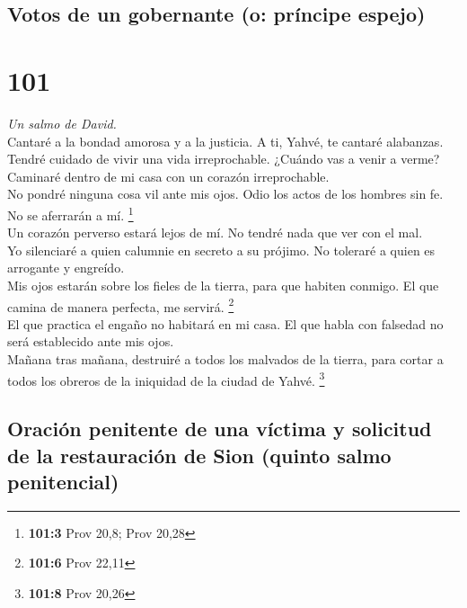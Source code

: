 \hypertarget{votos-de-un-gobernante-o-pruxedncipe-espejo}{%
\subsection{Votos de un gobernante (o: príncipe
espejo)}\label{votos-de-un-gobernante-o-pruxedncipe-espejo}}

\hypertarget{section-98}{%
\section{101}\label{section-98}}

\emph{Un salmo de David.}\\
 Cantaré a la bondad amorosa y a la justicia. A ti, Yahvé,
te cantaré alabanzas.\\
 Tendré cuidado de vivir una vida irreprochable. ¿Cuándo
vas a venir a verme? Caminaré dentro de mi casa con un corazón
irreprochable.\\
 No pondré ninguna cosa vil ante mis ojos. Odio los actos
de los hombres sin fe. No se aferrarán a mí. \footnote{\textbf{101:3}
  Prov 20,8; Prov 20,28}\\
 Un corazón perverso estará lejos de mí. No tendré nada
que ver con el mal.\\
 Yo silenciaré a quien calumnie en secreto a su prójimo.
No toleraré a quien es arrogante y engreído.\\
 Mis ojos estarán sobre los fieles de la tierra, para que
habiten conmigo. El que camina de manera perfecta, me servirá.
\footnote{\textbf{101:6} Prov 22,11}\\
 El que practica el engaño no habitará en mi casa. El que
habla con falsedad no será establecido ante mis ojos.\\
 Mañana tras mañana, destruiré a todos los malvados de la
tierra, para cortar a todos los obreros de la iniquidad de la ciudad de
Yahvé. \footnote{\textbf{101:8} Prov 20,26}

\hypertarget{oraciuxf3n-penitente-de-una-vuxedctima-y-solicitud-de-la-restauraciuxf3n-de-sion-quinto-salmo-penitencial}{%
\subsection{Oración penitente de una víctima y solicitud de la
restauración de Sion (quinto salmo
penitencial)}\label{oraciuxf3n-penitente-de-una-vuxedctima-y-solicitud-de-la-restauraciuxf3n-de-sion-quinto-salmo-penitencial}}

